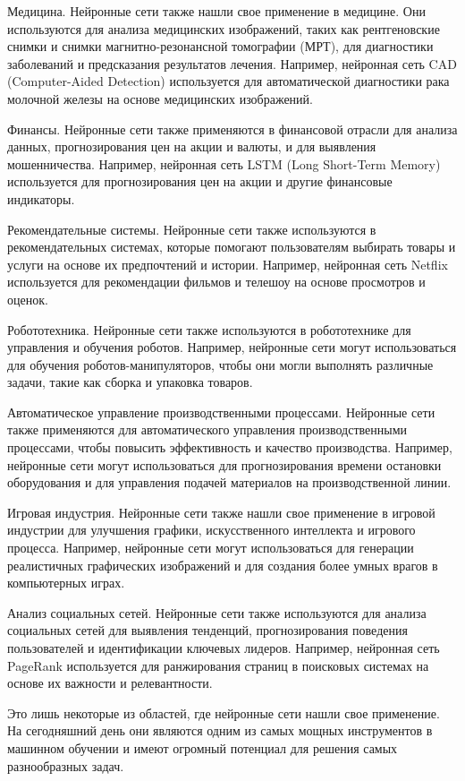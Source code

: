 Медицина. Нейронные сети также нашли свое применение в медицине. Они используются для анализа медицинских изображений, таких как рентгеновские снимки и снимки магнитно-резонансной томографии (МРТ), для диагностики заболеваний и предсказания результатов лечения. Например, нейронная сеть CAD (Computer-Aided Detection) используется для автоматической диагностики рака молочной железы на основе медицинских изображений.

Финансы. Нейронные сети также применяются в финансовой отрасли для анализа данных, прогнозирования цен на акции и валюты, и для выявления мошенничества. Например, нейронная сеть LSTM (Long Short-Term Memory) используется для прогнозирования цен на акции и другие финансовые индикаторы.

Рекомендательные системы. Нейронные сети также используются в рекомендательных системах, которые помогают пользователям выбирать товары и услуги на основе их предпочтений и истории. Например, нейронная сеть Netflix используется для рекомендации фильмов и телешоу на основе просмотров и оценок.

Робототехника. Нейронные сети также используются в робототехнике для управления и обучения роботов. Например, нейронные сети могут использоваться для обучения роботов-манипуляторов, чтобы они могли выполнять различные задачи, такие как сборка и упаковка товаров.

Автоматическое управление производственными процессами. Нейронные сети также применяются для автоматического управления производственными процессами, чтобы повысить эффективность и качество производства. Например, нейронные сети могут использоваться для прогнозирования времени остановки оборудования и для управления подачей материалов на производственной линии.

Игровая индустрия. Нейронные сети также нашли свое применение в игровой индустрии для улучшения графики, искусственного интеллекта и игрового процесса. Например, нейронные сети могут использоваться для генерации реалистичных графических изображений и для создания более умных врагов в компьютерных играх.

Анализ социальных сетей. Нейронные сети также используются для анализа социальных сетей для выявления тенденций, прогнозирования поведения пользователей и идентификации ключевых лидеров. Например, нейронная сеть PageRank используется для ранжирования страниц в поисковых системах на основе их важности и релевантности.

Это лишь некоторые из областей, где нейронные сети нашли свое применение. На сегодняшний день они являются одним из самых мощных инструментов в машинном обучении и имеют огромный потенциал для решения самых разнообразных задач.


